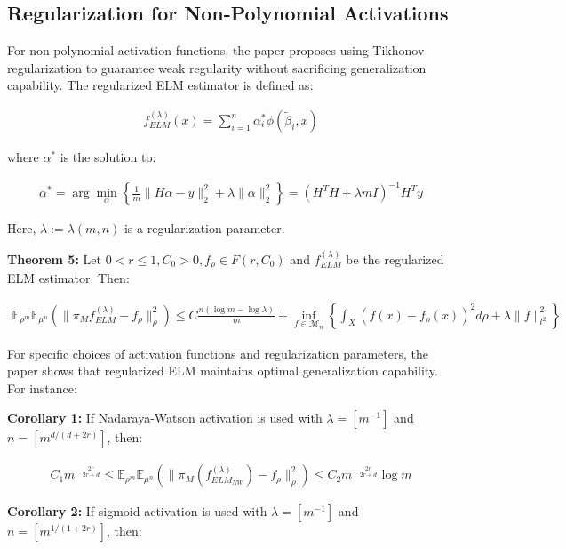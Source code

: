 \documentclass[11pt]{article}
\begin{document}
\subsection{Regularization for Non-Polynomial Activations}

For non-polynomial activation functions, the paper proposes using Tikhonov regularization to guarantee weak regularity without sacrificing generalization capability. The regularized ELM estimator is defined as:

\begin{align}
f_{ELM}^{(\lambda)}(x) = \sum_{i=1}^n \alpha_i^* \phi(\tilde{\beta}_i, x)
\end{align}

where $\alpha^*$ is the solution to:

\begin{align}
\alpha^* = \arg\min_\alpha \left\{\frac{1}{m} \|H\alpha - y\|_2^2 + \lambda \|\alpha\|_2^2\right\} = (H^T H + \lambda m I)^{-1} H^T y
\end{align}

Here, $\lambda := \lambda(m,n)$ is a regularization parameter.

\textbf{Theorem 5:} Let $0 < r \leq 1, C_0 > 0, f_\rho \in F(r, C_0)$ and $f_{ELM}^{(\lambda)}$ be the regularized ELM estimator. Then:

\begin{align}
\mathbb{E}_{\rho^m}\mathbb{E}_{\mu^n} \left( \|\pi_M f_{ELM}^{(\lambda)} - f_\rho\|_\rho^2 \right) \leq C\frac{n(\log m - \log \lambda)}{m} + \inf_{f \in \mathcal{M}_n} \left\{\int_X (f(x) - f_\rho(x))^2 d\rho + \lambda \|f\|_{l^2}^2\right\}
\end{align}

For specific choices of activation functions and regularization parameters, the paper shows that regularized ELM maintains optimal generalization capability. For instance:

\textbf{Corollary 1:} If Nadaraya-Watson activation is used with $\lambda = [m^{-1}]$ and $n = [m^{d/(d+2r)}]$, then:

\begin{align}
C_1 m^{-\frac{2r}{2r+d}} \leq \mathbb{E}_{\rho^m}\mathbb{E}_{\mu^n} \left( \|\pi_M(f_{ELM_{NW}}^{(\lambda)}) - f_\rho\|_\rho^2 \right) \leq C_2 m^{-\frac{2r}{2r+d}} \log m
\end{align}

\textbf{Corollary 2:} If sigmoid activation is used with $\lambda = [m^{-1}]$ and $n = [m^{1/(1+2r)}]$, then:
\end{document}
